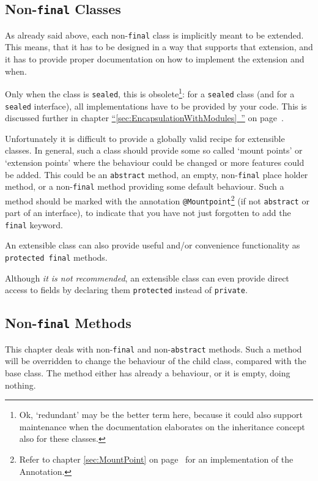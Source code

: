 \documentclass[11pt,a4paper, titlepage, parskip=half, headsepline, footsepline, cleardoublepage=current, headheight=1cm]{scrbook}
\newcommand*{\tqfullvref}[1]{\hyperref[{#1}]{“\ref*{#1}~\nameref*{#1}”} on page~\pageref{#1}}
\newcommand*{\tqvref}[1]{\hyperref[{#1}]{\ref*{#1}} on page~\pageref{#1}}
\begin{document}

\subsection{Non-\lstinline|final| Classes}\label{sec:NonFinalClasses}
As already said above, each non-\lstinline|final| class is implicitly meant to be extended. This means, that it has to be designed in a way that supports that extension, and it has to provide proper documentation on how to implement the extension and when.

Only when the class is \lstinline|sealed|\autocite{ORACLE_DOC_LANGUAGE_SPECIFICATION:SealedClasses, ORACLE_DOC_LANGUAGE_SPECIFICATION:SealedInterfaces}, this is obsolete\footnote{Ok, ‘redundant’ may be the better term here, because it could also support maintenance when the documentation elaborates on the inheritance concept also for these classes.}: for a \lstinline|sealed| class (and for a \lstinline|sealed| interface), all implementations have to be provided by your code. This is discussed further in chapter \tqfullvref{sec:EncapsulationWithModules}.

Unfortunately it is difficult to provide a globally valid recipe for extensible classes. In general, such a class should provide some so called ‘mount points’ or ‘extension points’ where the behaviour could be changed or more features could be added. This could be an \lstinline|abstract| method, an empty, non-\lstinline|final| place holder method, or a non-\lstinline|final| method providing some default behaviour. Such a method should be marked with the annotation \lstinline|@Mountpoint|\footnote{Refer to chapter \tqvref{sec:MountPoint} for an implementation of the Annotation.} (if not \lstinline|abstract| or part of an interface), to indicate that you have not just forgotten to add the \lstinline|final| keyword.

An extensible class can also provide useful and/or convenience functionality as \lstinline|protected final| methods. 

Although \textit{it is not recommended}, an extensible class can even provide direct access to fields by declaring them \lstinline|protected| instead of \lstinline|private|.


\subsection{Non-\lstinline|final| Methods}\label{sec:NonFinalMethods}
This chapter deals with non-\lstinline|final| and non-\lstinline|abstract| methods. Such a method will be overridden to change the behaviour of the child class, compared with the base class. The method either has already a behaviour, or it is empty, doing nothing.
\end{document}
